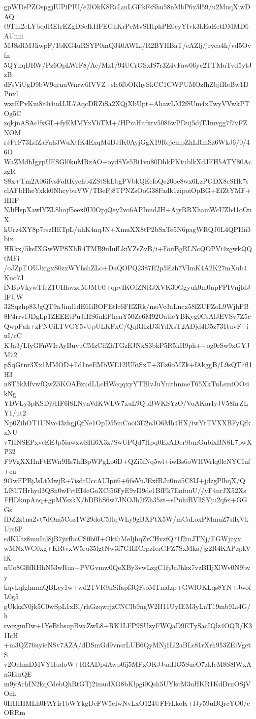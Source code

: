gpWDePZOspgjIUPiPIU/e2lOkK8RcLmLGFkFsShu58nMbP6x5l59/u2MuqXiwDAQ
t9Tm2eLYbqdREIrEZgDScIkHFEGhKrPcMvSHIphPE0cyYIvk3kEaEetDMMD6AUnm
MJ8sRMJliwpF/1bKG4uRSYP0mQ340AWLl/R2BYHBaT/eAZlj/jryea4k/vd5Ovfn
5QYhqDRW/Pz6OpLWrF8/Ac/Mz1/94UCrGSxlS7r3Z4vFaw06yc2TTMuTvd5ytJzB
dFsViUgD9bW9qrnuWnrw6IVVZ+slc6fbOKhySkCC1CWPUMOzfhZbjfReBw1DPnxl
wzrEPvKm8r4i4udJJL7AqcDRZiSa2XQjXbUpt+AhawLM2f8Um4xTwyVVwkPTOg5C
zqkjnASAclfxGL+fyEMMYxVbTM+/HPmHnfxrv5086wPDuj5djTJmvgg7f7vFZNOM
rJPrF73LdZaFah3WuXtfK4ExqM4DJfK0AyjGgX19RqjempZhLRmSz6WkJ6/0/46O
WaZMdhIgypUESGl0kuMRzAO+oyd8Ye5Bi1vu80DhkPKtublkXdJFH5ATY80AczgR
S8x+Tm2A06ifvsFoItKyehb4ZStSkLbgPVbkQEcfoQc20oe8wx6LzPGDX8cSHk7s
clAFbHheYxkk0NhcybuVW/TBeFj8TPNZsOoG38Fadk1zipoiOpBG+EfZtYMF+HHF
NJiHspXawlYZL8hojf5eex0U0OpjQey2vo6APInudJH+AjyRRXhamWcUZb41oOuX
kUrz4XY8p7rszHETpL/uhK4nqJN+XmuXX8tP2bSxTe5N6pagWRQJ0L4QPHii3bix
HRkx/5ksIXGwWPSXhR4TMB9uIufLkiVZsZvB/i+FouBgRLNcQOPVi4zgwkQQtMFi
/oJZpTOUJxigxS0zxWYhshZLo+DaQOPQ2387E2p5Ezh7VImK4A2K27mXub4Kno7J
fNBpVkywTfeZ1UHhwzqMJMU0+qpvIKOfZNRJXVK30Ggyuk0m0npPPIVnjIdJIFUW
32Sqzhp83JgQT9aJiml1dE6IiBOPEtlc6FEZRk/moVc3aLncx58fZUFZoL9WjhFB
8P4rrvIJDgLp1ZEEEtPuJfHS6uEPhenY50Zc6M92OatieYBKyg0CsAlJEVSv7Z5c
QwpPah+zPNUiLTVGY5vUpULKFxC/QqRHzD3iYdXsT2ADjd4D5z731tuvF+inI/cC
KJa3/LfyGFnWIcAyBuvuCMzCflZhTGzEJNxS3bkP5R5kH9ph++og0rSw9xGYJM72
pSqGtnr3Xx1MMOD+lld1neEMbWE12lU5tSxT+3Ez6oMZk+fAkggB/L9sQT7fl1H3
n8T5kMfvwfQwZ5KOABzndLLcHWcqqxyYTBlvJuYuithnmeT65XkTuLsmiOOsikNg
YDVLy3pKSDj9HF6l8LNynVdKWLW7xuL9QbBWKSYzO/VoAKarIyJV58hrZLY1/ut2
Np0ZihOT1UNvc43zhgjQfNe1OpD55mCooi3E2n3O6Mh4HX/iwYtTVXXBFyQfkzNU
v7HNSEPxvcEEJp5iuwxwSHi6X3z/SwUPQd7Hpq0EzADer9bmGubixBN8L7pwXP32
F9VgXXHnFtEWn9Hs7hfBpWPgLo6D+QZi5fNq5wl+iwBs6oWHWrlq0lcNYCIuf+en
9OwFPBjJsLtMwjR+7isdtUccAUIpii6+66eVuJExfBJu0mi5C8IJ+jdzgPlbqX/Q
Lf8U7Hrhyd3QSn0wFrtEI4eGoXCf56FyE9vD9de1BfFk7EnfuuU//yF4nrJX52Xs
FHDkupAnq+gpMYszkX/bDBhS6w7JNOJh2fZh35zt+sPuhiBVllSYju2qfei+GGGs
fDZ2z1na2vt7dOm5Coz1W29doC5HqWLy9gBXPtX5W/mCaLoxPMmuZ7slKVkUrs6P
sdKUtz8mnIul8jB7jirfbcCS0b0I+OkthMeIjhqZrCHvzfQ71f2mJTNj/EGWjnyx
wMNxWG0xg+KRtvxW5ru35lgtNw3f7GRffCrpzIerGPZ7SxMka/jg2R4KAPzpkVlK
nUo8GflfRHhN53wRua+PVGvmw0QeXBy3vwLzgC1fjJcJhkx7vzBIIjXlWv0N9bvy
kqvkqfghmmQBLcy1w+wd2TVR9nSifapf3QFsoMTmdzp+GWlOKLqs8YN+JwofL0g5
gUkkzN0jk5C0wSpL1xBl/rhGzqwrjzCNCIb9ngW2H11UyIEM3yLnT19mb9Li4G/h
rvczgmDw+1YeBtbsupBwcZwL8+RK1LFP9SUzyFWQaD9ETySacIQlz4OQB/K31IcH
+m3QZ76uyieNSv7AZA/dDSmGd9vnsrLUB6QyMNj1Ll2aBLs81rXrh953ZEiVgetS
v2OchmDMVYHudoW+RRADp4Awp0ij5MFxOKJJuaHO5SueO7zkfeM8S8lWxAn3EmQE
m9yArhIN2kqCdebQhRtGTj2imudXO8bKlpgi0Qsh5UYkoM3uHKR1KdDrnOSjVOch
0IHHHMLh0PAYir1bWYkgDeFW5cIwNvLxO124UFFrLkoK+IJy59uBQrcYO0/eORRm
